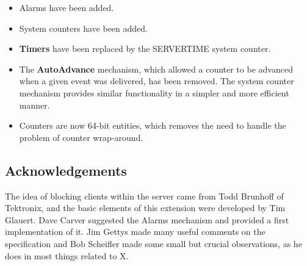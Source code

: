 \begin{itemize}

\item Alarms have been added.

\item System counters have been added.

\item {\bf Timers} have been replaced by the SERVERTIME system counter.

\item The {\bf AutoAdvance} mechanism, which allowed a counter to be advanced
when a given event was delivered, has been removed. The system counter
mechanism provides similar functionality in a simpler and more efficient
manner.

\item Counters are now 64-bit entities, which removes the need to handle the
problem of counter wrap-around.

\end{itemize}

\subsection*{Acknowledgements}

The idea of blocking clients within the server came from Todd Brunhoff of
Tektronix, and the basic elements of this extension were developed by Tim
Glauert. Dave Carver suggested the Alarms mechanism and provided a first
implementation of it. Jim Gettys made many useful comments on the
specification and Bob Scheifler made some small but crucial observations, as
he does in most things related to X.



